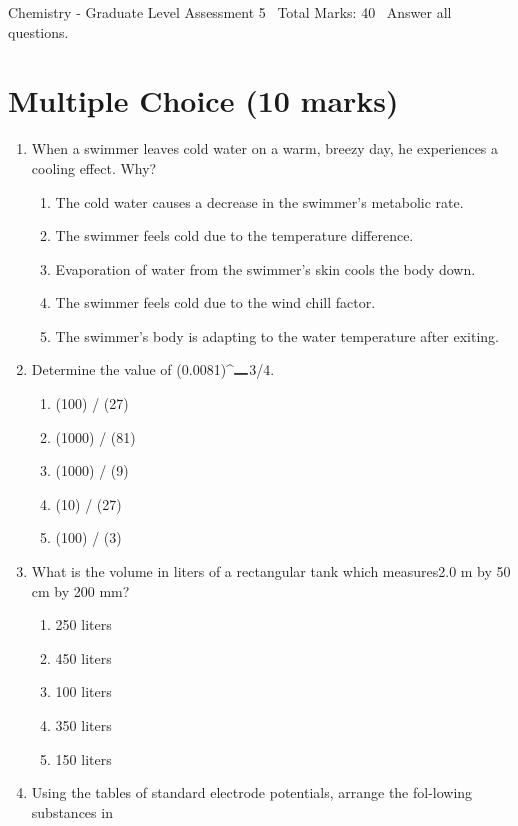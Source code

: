 \documentclass[12pt]{article}
\begin{document}
\begin{center}
Chemistry - Graduate Level Assessment 5 \
Total Marks: 40 \
Answer all questions.
\end{center}

\section*{Multiple Choice (10 marks)}
\begin{enumerate}[label=\arabic*.]
\item When a swimmer leaves cold water on a warm, breezy day, he experiences a cooling effect.
Why?
\begin{enumerate}[label=(\alph*)]
    \item The cold water causes a decrease in the swimmer's metabolic rate.
    \item The swimmer feels cold due to the temperature difference.
    \item Evaporation of water from the swimmer's skin cools the body down.
    \item The swimmer feels cold due to the wind chill factor.
    \item The swimmer's body is adapting to the water temperature after exiting.
\end{enumerate}
\item Determine the value of (0.0081)\^{}\ensuremath{\rule{1em}{1pt}}3/4.
\begin{enumerate}[label=(\alph*)]
    \item (100) / (27)
    \item (1000) / (81)
    \item (1000) / (9)
    \item (10) / (27)
    \item (100) / (3)
\end{enumerate}
\item What is the volume in liters of a rectangular tank which measures2.0 m by 50 cm by 200 mm?
\begin{enumerate}[label=(\alph*)]
    \item 250 liters
    \item 450 liters
    \item 100 liters
    \item 350 liters
    \item 150 liters
\end{enumerate}
\item Using the tables of standard electrode potentials, arrange the fol-lowing substances in

\end{enumerate}
\end{document}
